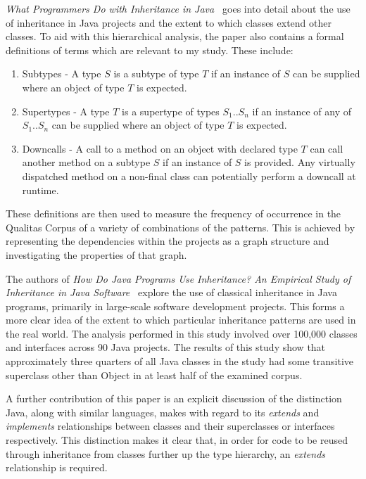 \documentclass[11pt
              , a4paper
              , twoside
              , openright
              ]{report}
\begin{document}
\textit{What Programmers Do with Inheritance in Java~\cite{InheritanceInJava}} goes into detail about the use of inheritance in Java projects and the extent to which classes extend other classes. To aid with this hierarchical analysis, the paper also contains a formal definitions of terms which are relevant to my study. These include:
\begin{enumerate}
	\item Subtypes - A type $S$ is a subtype of type $T$ if an instance of $S$ can be supplied where an object of type $T$ is expected.
	\item Supertypes - A type $T$ is a supertype of types $S_1..S_n$ if an instance of any of $S_1..S_n$ can be supplied where an object of type $T$ is expected.
	\item Downcalls - A call to a method on an object with declared type $T$ can call another method on a subtype $S$ if an instance of $S$ is provided. Any virtually dispatched method on a non-final class can potentially perform a downcall at runtime.
\end{enumerate}

These definitions are then used to measure the frequency of occurrence in the Qualitas Corpus of a variety of combinations of the patterns. This is achieved by representing the dependencies within the projects as a graph structure and investigating the properties of that graph.
\newline

The authors of \textit{How Do Java Programs Use Inheritance? An Empirical Study of Inheritance in Java Software~\cite{HowProgramsUseInheritance}} explore the use of classical inheritance in Java programs, primarily in large-scale software development projects. This forms a more clear idea of the extent to which particular inheritance patterns are used in the real world. The analysis performed in this study involved over 100,000 classes and interfaces across 90 Java projects. The results of this study show that approximately three quarters of all Java classes in the study had some transitive superclass other than Object in at least half of the examined corpus.
\newline

A further contribution of this paper is an explicit discussion of the distinction Java, along with similar languages, makes with regard to its \textit{extends} and \textit{implements} relationships between classes and their superclasses or interfaces respectively. This distinction makes it clear that, in order for code to be reused through inheritance from classes further up the type hierarchy, an \textit{extends} relationship is required.
\end{document}
